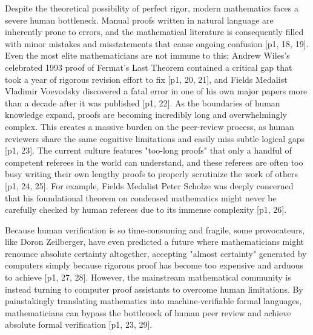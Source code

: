 Despite the theoretical possibility of perfect rigor, modern mathematics faces a severe human bottleneck. Manual proofs written in natural language are inherently prone to errors, and the mathematical literature is consequently filled with minor mistakes and misstatements that cause ongoing confusion [p1, 18, 19]. Even the most elite mathematicians are not immune to this; Andrew Wiles's celebrated 1993 proof of Fermat’s Last Theorem contained a critical gap that took a year of rigorous revision effort to fix [p1, 20, 21], and Fields Medalist Vladimir Voevodsky discovered a fatal error in one of his own major papers more than a decade after it was published [p1, 22]. As the boundaries of human knowledge expand, proofs are becoming incredibly long and overwhelmingly complex. This creates a massive burden on the peer-review process, as human reviewers share the same cognitive limitations and easily miss subtle logical gaps [p1, 23]. The current culture features "too-long proofs" that only a handful of competent referees in the world can understand, and these referees are often too busy writing their own lengthy proofs to properly scrutinize the work of others [p1, 24, 25]. For example, Fields Medalist Peter Scholze was deeply concerned that his foundational theorem on condensed mathematics might never be carefully checked by human referees due to its immense complexity [p1, 26].

Because human verification is so time-consuming and fragile, some provocateurs, like Doron Zeilberger, have even predicted a future where mathematicians might renounce absolute certainty altogether, accepting "almost certainty" generated by computers simply because rigorous proof has become too expensive and arduous to achieve [p1, 27, 28]. However, the mainstream mathematical community is instead turning to computer proof assistants to overcome human limitations. By painstakingly translating mathematics into machine-verifiable formal languages, mathematicians can bypass the bottleneck of human peer review and achieve absolute formal verification [p1, 23, 29].

